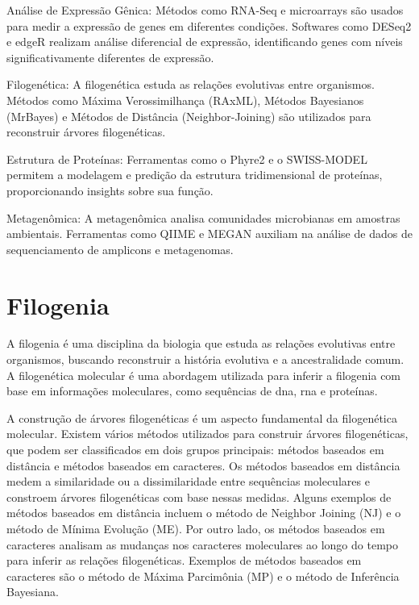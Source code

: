 Análise de Expressão Gênica:
Métodos como RNA-Seq e microarrays são usados para medir a expressão de genes em diferentes condições. Softwares como DESeq2 e edgeR realizam análise diferencial de expressão, identificando genes com níveis significativamente diferentes de expressão.

Filogenética:
A filogenética estuda as relações evolutivas entre organismos. Métodos como Máxima Verossimilhança (RAxML), Métodos Bayesianos (MrBayes) e Métodos de Distância (Neighbor-Joining) são utilizados para reconstruir árvores filogenéticas.

Estrutura de Proteínas:
Ferramentas como o Phyre2 e o SWISS-MODEL permitem a modelagem e predição da estrutura tridimensional de proteínas, proporcionando insights sobre sua função.

Metagenômica:
A metagenômica analisa comunidades microbianas em amostras ambientais. Ferramentas como QIIME e MEGAN auxiliam na análise de dados de sequenciamento de amplicons e metagenomas.
\section{Filogenia}

A filogenia é uma disciplina da biologia que estuda as relações evolutivas entre organismos, buscando reconstruir a história evolutiva e a ancestralidade comum. A filogenética molecular é uma abordagem utilizada para inferir a filogenia com base em informações moleculares, como sequências de \gls{dna}, \gls{rna} e proteínas\cite{felsenstein_inferring_2004}.

A construção de árvores filogenéticas é um aspecto fundamental da filogenética molecular. Existem vários métodos utilizados para construir árvores filogenéticas, que podem ser classificados em dois grupos principais: métodos baseados em distância e métodos baseados em caracteres.
Os métodos baseados em distância medem a similaridade ou a dissimilaridade entre sequências moleculares e constroem árvores filogenéticas com base nessas medidas. Alguns exemplos de métodos baseados em distância incluem o método de Neighbor Joining (NJ) e o método de Mínima Evolução (ME).
Por outro lado, os métodos baseados em caracteres analisam as mudanças nos caracteres moleculares ao longo do tempo para inferir as relações filogenéticas. Exemplos de métodos baseados em caracteres são o método de Máxima Parcimônia (MP) e o método de Inferência Bayesiana\cite{swofford_phylogenetic_1996}.

